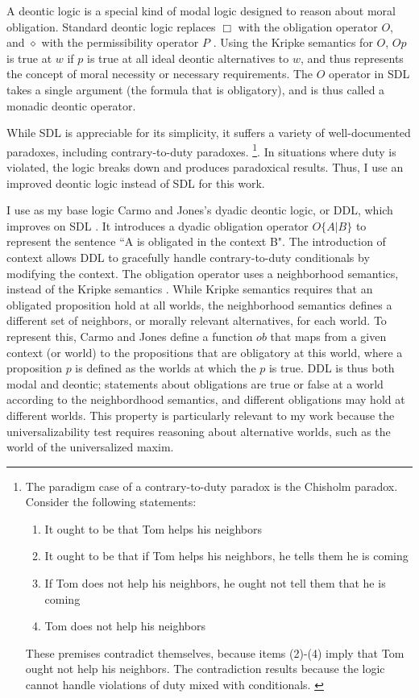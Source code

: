 \begin{isabellebody}
\begin{isamarkuptext}
A deontic logic is a special kind of modal logic designed to reason about moral obligation. Standard deontic
logic replaces $\Box$ with the obligation operator
$O$, and $\diamond$ with the permissibility operator $P$ \citep{cresswell, sep-logic-deontic}. Using the Kripke semantics for $O$, $O p$ 
is true at $w$ if $p$ is true at all  ideal deontic alternatives to $w$, and thus represents the 
concept of moral necessity or necessary requirements. The $O$ operator in SDL
takes a single argument (the formula that is obligatory), and is thus called a monadic deontic operator.

 While SDL is appreciable for its simplicity, it suffers a variety of well-documented paradoxes, 
including contrary-to-duty paradoxes. \footnote{The paradigm case of a contrary-to-duty paradox is the 
Chisholm paradox. Consider the following statements: \begin{enumerate}
\item It ought to be that Tom helps his neighbors
\item It ought to be that if Tom helps his neighbors, he tells them he is coming
\item If Tom does not help his neighbors, he ought not tell them that he is coming
\item Tom does not help his neighbors
\end{enumerate} 
These premises contradict themselves, because items (2)-(4) imply that Tom ought not help his neighbors. The 
contradiction results because the logic cannot handle violations of duty mixed with
conditionals. \citep{chisholm, ctd}
}. In situations where duty is violated, the logic breaks down 
and produces paradoxical results. Thus, I use an improved deontic logic instead of SDL for this work.%
\end{isamarkuptext}\isamarkuptrue%
%
\begin{isamarkuptext}%
I use as my base logic Carmo and Jones's dyadic deontic logic, or DDL, which improves on SDL \citep{CJDDL}. 
It introduces a dyadic obligation operator $O\{A \vert B\}$ 
to represent the sentence ``A is obligated in the context B". The introduction of context allows DDL to
gracefully handle contrary-to-duty conditionals by modifying the context. The obligation operator uses 
a neighborhood semantics, instead of the Kripke semantics \citep{neighborhood1, neighborhood2}. While Kripke
semantics requires that an obligated proposition hold at all worlds, the neighborhood semantics defines
a different set of neighbors, or morally relevant alternatives, for each world. To represent this,
Carmo and Jones define a function $ob$ that maps from a given context (or world) to the propositions 
that are obligatory at this world, where a proposition $p$ is defined as 
the worlds at which the $p$ is true. DDL is thus both modal and deontic; statements about obligations are
true or false at a world according to the neighbordhood 
semantics, and different obligations may hold at different worlds. This property is particularly relevant to my work because the universalizability test
requires reasoning about alternative worlds, such as the world of the universalized maxim.


\end{isamarkuptext}
\end{isabellebody}
